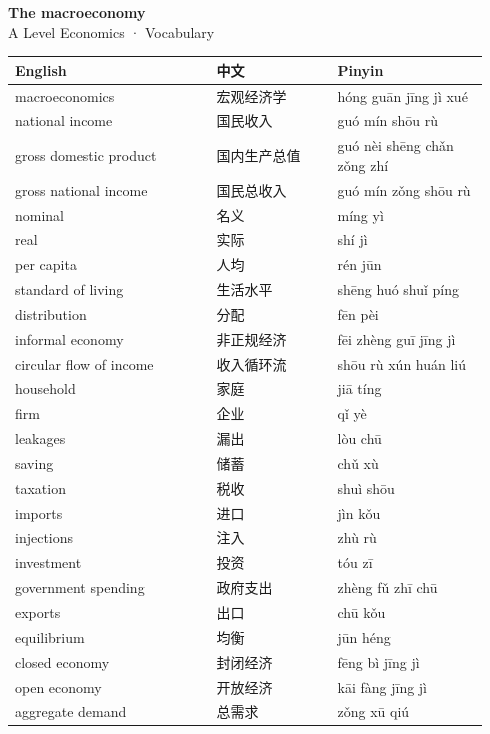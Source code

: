 \documentclass[11pt]{article}
\begin{document}
\begin{center}
  {\LARGE\bfseries The macroeconomy}\\[0.35em]
  {\large A Level Economics · Vocabulary}
\end{center}
\vspace{0.6em}

\begin{longtable}{@{}p{0.40\linewidth}p{0.24\linewidth}p{0.30\linewidth}@{}}
\toprule
\textbf{English} & \textbf{中文} & \textbf{Pinyin} \\
\midrule
\endhead
\bottomrule
\endlastfoot
macroeconomics & 宏观经济学 & hóng guān jīng jì xué \\
national income & 国民收入 & guó mín shōu rù \\
gross domestic product & 国内生产总值 & guó nèi shēng chǎn zǒng zhí \\
gross national income & 国民总收入 & guó mín zǒng shōu rù \\
nominal & 名义 & míng yì \\
real & 实际 & shí jì \\
per capita & 人均 & rén jūn \\
standard of living & 生活水平 & shēng huó shuǐ píng \\
distribution & 分配 & fēn pèi \\
informal economy & 非正规经济 & fēi zhèng guī jīng jì \\
circular flow of income & 收入循环流 & shōu rù xún huán liú \\
household & 家庭 & jiā tíng \\
firm & 企业 & qǐ yè \\
leakages & 漏出 & lòu chū \\
saving & 储蓄 & chǔ xù \\
taxation & 税收 & shuì shōu \\
imports & 进口 & jìn kǒu \\
injections & 注入 & zhù rù \\
investment & 投资 & tóu zī \\
government spending & 政府支出 & zhèng fǔ zhī chū \\
exports & 出口 & chū kǒu \\
equilibrium & 均衡 & jūn héng \\
closed economy & 封闭经济 & fēng bì jīng jì \\
open economy & 开放经济 & kāi fàng jīng jì \\
aggregate demand & 总需求 & zǒng xū qiú \\

\end{longtable}
\end{document}
